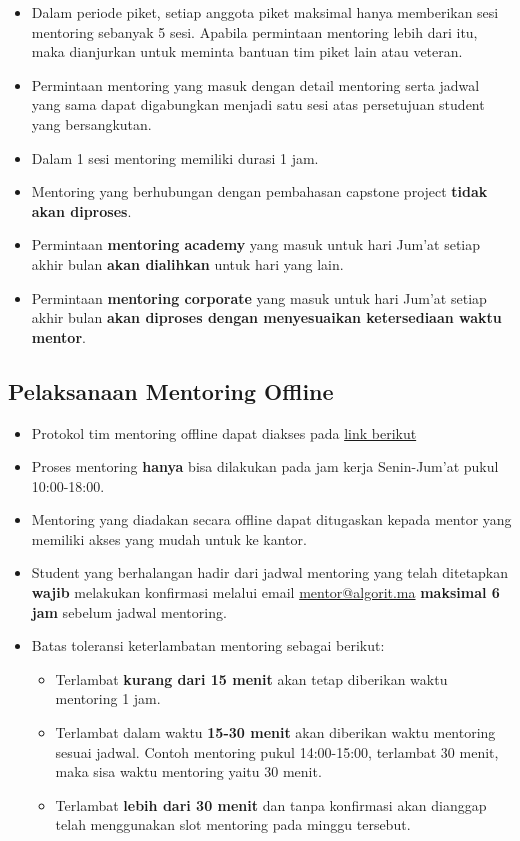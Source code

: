 \documentclass[
]{book}
\providecommand{\tightlist}{%
  \setlength{\itemsep}{0pt}\setlength{\parskip}{0pt}}
\begin{document}
\begin{itemize}
\tightlist
\item
  Dalam periode piket, setiap anggota piket maksimal hanya memberikan sesi mentoring sebanyak 5 sesi. Apabila permintaan mentoring lebih dari itu, maka dianjurkan untuk meminta bantuan tim piket lain atau veteran.
\item
  Permintaan mentoring yang masuk dengan detail mentoring serta jadwal yang sama dapat digabungkan menjadi satu sesi atas persetujuan student yang bersangkutan.
\item
  Dalam 1 sesi mentoring memiliki durasi 1 jam.
\item
  Mentoring yang berhubungan dengan pembahasan capstone project \textbf{tidak akan diproses}.
\item
  Permintaan \textbf{mentoring academy} yang masuk untuk hari Jum'at setiap akhir bulan \textbf{akan dialihkan} untuk hari yang lain.
\item
  Permintaan \textbf{mentoring corporate} yang masuk untuk hari Jum'at setiap akhir bulan \textbf{akan diproses dengan menyesuaikan ketersediaan waktu mentor}.
\end{itemize}

\hypertarget{pelaksanaan-mentoring-offline}{%
\subsection{Pelaksanaan Mentoring Offline}\label{pelaksanaan-mentoring-offline}}

\begin{itemize}
\item
  Protokol tim mentoring offline dapat diakses pada \href{https://docs.google.com/document/d/1L6lA0MJoyhfeYlzFBf-TuuJ8SGhZE4Yc49_kXDWkkLw/edit?usp=sharing}{link berikut}
\item
  Proses mentoring \textbf{hanya} bisa dilakukan pada jam kerja Senin-Jum'at pukul 10:00-18:00.
\item
  Mentoring yang diadakan secara offline dapat ditugaskan kepada mentor yang memiliki akses yang mudah untuk ke kantor.
\item
  Student yang berhalangan hadir dari jadwal mentoring yang telah ditetapkan \textbf{wajib} melakukan konfirmasi melalui email \url{mentor@algorit.ma} \textbf{maksimal 6 jam} sebelum jadwal mentoring.
\item
  Batas toleransi keterlambatan mentoring sebagai berikut:

  \begin{itemize}
  \tightlist
  \item
    Terlambat \textbf{kurang dari 15 menit} akan tetap diberikan waktu mentoring 1 jam.
  \item
    Terlambat dalam waktu \textbf{15-30 menit} akan diberikan waktu mentoring sesuai jadwal. Contoh mentoring pukul 14:00-15:00, terlambat 30 menit, maka sisa waktu mentoring yaitu 30 menit.
  \item
    Terlambat \textbf{lebih dari 30 menit} dan tanpa konfirmasi akan dianggap telah menggunakan slot mentoring pada minggu tersebut.
  \end{itemize}
\end{itemize}
\end{document}
